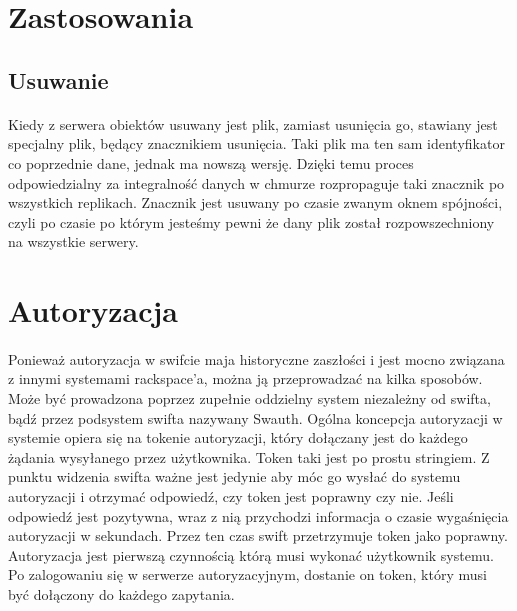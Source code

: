 \section{Zastosowania}\label{sec:zastosowania}

\subsection{Usuwanie}\label{sub:usuwanie}
\paragraph{}

Kiedy z serwera obiektów usuwany jest plik, zamiast usunięcia go, stawiany jest specjalny plik, będący znacznikiem usunięcia. Taki plik ma ten sam identyfikator co poprzednie dane, jednak ma nowszą wersję. Dzięki temu proces odpowiedzialny za integralność danych w chmurze rozpropaguje taki znacznik po wszystkich replikach. Znacznik jest usuwany po czasie zwanym oknem spójności, czyli po czasie po którym jesteśmy pewni że dany plik został rozpowszechniony na wszystkie serwery.

\section{Autoryzacja}\label{sec:autoryzacja}
\paragraph{}

Ponieważ autoryzacja w swifcie maja historyczne zaszłości i jest mocno związana z innymi systemami rackspace'a, można ją przeprowadzać na kilka sposobów. Może być prowadzona poprzez zupełnie oddzielny system niezależny od swifta, bądź przez podsystem swifta nazywany Swauth. Ogólna koncepcja autoryzacji w systemie opiera się na tokenie autoryzacji, który dołączany jest do każdego żądania wysyłanego przez użytkownika. Token taki jest po prostu stringiem. Z punktu widzenia swifta ważne jest jedynie aby móc go wysłać do systemu autoryzacji i otrzymać odpowiedź, czy token jest poprawny czy nie. Jeśli odpowiedź jest pozytywna, wraz z nią przychodzi informacja o czasie wygaśnięcia autoryzacji w sekundach. Przez ten czas swift przetrzymuje token jako poprawny. Autoryzacja jest pierwszą czynnością którą musi wykonać użytkownik systemu. Po zalogowaniu się w serwerze autoryzacyjnym, dostanie on token, który musi być dołączony do każdego zapytania.

\paragraph{}

